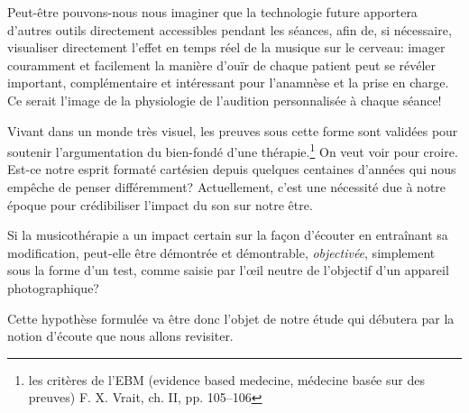 Peut-être pouvons-nous nous imaginer que la technologie future apportera d'autres outils
directement accessibles pendant les séances, afin
 de, si nécessaire, visualiser directement l'effet en temps réel de la musique sur le
 cerveau:  imager couramment et facilement la manière d'ouïr de chaque
 patient peut se révéler important, complémentaire et intéressant pour
 l'anamnèse et la prise en charge. Ce serait l'image de la
 physiologie de l'audition personnalisée à chaque séance!

 
Vivant dans un monde très visuel, les preuves sous cette forme sont
validées pour soutenir l'argumentation du bien-fondé d'une thérapie.\footnote{
	les critères de l'EBM (evidence based medecine, médecine basée sur des 
        preuves) F. X. Vrait, ch. II, pp. 105--106 }
On veut voir pour croire. Est-ce 
notre esprit formaté cartésien depuis quelques centaines d'années qui nous 
empêche de penser différemment? 
Actuellement, c'est une nécessité due à notre époque pour crédibiliser l'impact 
du son sur notre être.


Si la 
musicothérapie a un impact certain sur la façon d'écouter en
entraînant sa 
modification, peut-elle être  démontrée et démontrable, \textsl{objectivée},
simplement sous la forme d'un test, comme saisie par 
l'\oe il neutre de l'objectif d'un appareil
photographique?

Cette hypothèse formulée va être donc l'objet de notre étude qui
débutera par la notion d'écoute que nous allons revisiter.
